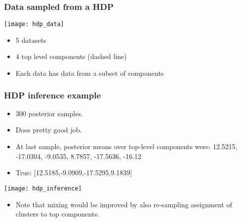 \begin{frame}
	\frametitle{Data sampled from a \ac{HDP}}
	\begin{multicols}{2}
		\centering\texttt{[image: hdp\_data]}
		\newpage
		\begin{itemize}
			\item 5 datasets
			\item 4 top level components (dashed line)
			\item Each data has data from a subset of components
		\end{itemize}
	\end{multicols}
\end{frame}

\begin{frame}
	\frametitle{\ac{HDP} inference example}
	\begin{multicols}{2}
	\begin{itemize}
		\item 300 posterior samples.
		\item Does pretty good job.
		\item At last sample, posterior means over top-level components were: 12.5215, -17.0304, -9.0535, 8.7857, -17.5636, -16.12
		\item True: [12.5185,-9.0909,-17.5295,9.1839]
	\end{itemize}
	\newpage
	\texttt{[image: hdp\_inference]}		
	\end{multicols}
	\begin{itemize}
		\item Note that mixing would be improved by also re-sampling assignment of clusters to top components.
	\end{itemize}
\end{frame}
